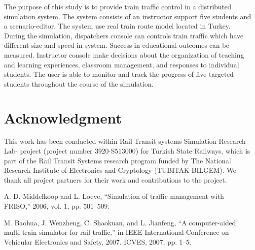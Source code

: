 \documentclass[conference]{IEEEtran}
\begin{document}
The purpose of this study is to provide train traffic control in a distributed simulation system. The system consists of an instructor support five students and a scenario-editor. The system use real train route model located in Turkey.  During the simulation, dispatchers console can controls train traffic which have different  size and speed in system. Success in educational outcomes can be measured. Instructor console make decisions about the organization of teaching and learning experiences, classroom management, and responses to individual students. The user is able to monitor and track the progress of five targeted students throughout the course of the simulation.





\section*{Acknowledgment}


This work has been conducted within Rail Transit systems Simulation Research Lab- project (project number 3920-S513000) for Turkish State Railways, which is part of the Rail Transit Systems research program funded by The National Research Institute of Electronics and Cryptology (TUBITAK BILGEM). We thank all project partners for their work and contributions to the project.

\begin{thebibliography}{1}

A. D. Middelkoop and L. Loeve, “Simulation of traffic management with FRISO,” 2006, vol. 1, pp. 501–509.

M. Baohua, J. Wenzheng, C. Shaokuan, and L. Jianfeng, “A computer-aided multi-train simulator for rail traffic,” in IEEE International Conference on Vehicular Electronics and Safety, 2007. ICVES, 2007, pp. 1–5.
 
 
 

\end{thebibliography}




\end{document}
